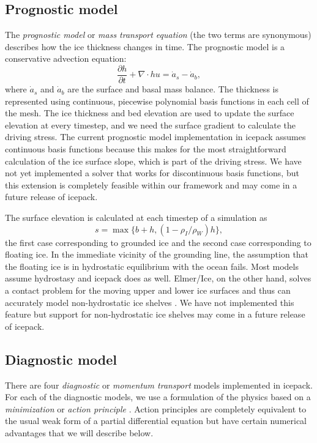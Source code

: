 \documentclass[journal abbreviation, manuscript]{copernicus}
\begin{document}
\subsection{Prognostic model}

The \emph{prognostic model} or \emph{mass transport equation} (the two terms are synonymous) describes how the ice thickness changes in time.
The prognostic model is a conservative advection equation:
\begin{equation}
    \frac{\partial h}{\partial t} + \nabla\cdot hu = \dot a_s - \dot a_b,
\end{equation}
where $\dot a_s$ and $\dot a_b$ are the surface and basal mass balance.
The thickness is represented using continuous, piecewise polynomial basis functions in each cell of the mesh.
The ice thickness and bed elevation are used to update the surface elevation at every timestep, and we need the surface gradient to calculate the driving stress.
The current prognostic model implementation in icepack assumes continuous basis functions because this makes for the most straightforward calculation of the ice surface slope, which is part of the driving stress.
We have not yet implemented a solver that works for discontinuous basis functions, but this extension is completely feasible within our framework and may come in a future release of icepack.

The surface elevation is calculated at each timestep of a simulation as
\begin{equation}
    s = \max\{b + h, (1 - \rho_I / \rho_W)h\},
\end{equation}
the first case corresponding to grounded ice and the second case corresponding to floating ice.
In the immediate vicinity of the grounding line, the assumption that the floating ice is in hydrostatic equilibrium with the ocean fails.
Most models assume hydrostasy and icepack does as well.
Elmer/Ice, on the other hand, solves a contact problem for the moving upper and lower ice surfaces and thus can accurately model non-hydrostatic ice shelves \citep{gagliardini2013capabilities}.
We have not implemented this feature but support for non-hydrostatic ice shelves may come in a future release of icepack.


\subsection{Diagnostic model}

There are four \emph{diagnostic} or \emph{momentum transport} models implemented in icepack.
For each of the diagnostic models, we use a formulation of the physics based on a \emph{minimization} or \emph{action principle} \citep{dukowicz2010consistent}.
Action principles are completely equivalent to the usual weak form of a partial differential equation but have certain numerical advantages that we will describe below.
\end{document}
